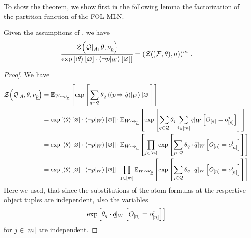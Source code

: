 To show the theorem, we show first in the following lemma the factorization of the partition function of the FOL MLN.

\begin{lemma}\label{lem:FOLpartitionfunctionfactorization}
	Given the assumptions of , we have
	\begin{align*}
		\frac{\mathcal{Z}{\left(\mathcal{Q} |_{A},\theta , \nu_{\underline{p}}\right)}}{\mathrm{exp}\left[\left\langle \theta\right\rangle \left[ \varnothing \right] \cdot \left\langle {\lnot p}|_{W}\right\rangle \left[ \varnothing \right]\right]} = \left(\mathcal{Z}{\left((\mathcal{F},\theta),\mu\right)}\right)^m \, .
	\end{align*}
\end{lemma}
\begin{proof}
	We have
	\begin{align*}
		\mathcal{Z}{\left(\mathcal{Q} |_{A},\theta , \nu_{\underline{p}}\right)} 
		&= \mathbb{E}_{W\sim\nu_{\underline{p}}}\left[
			 \mathrm{exp}\left[\sum_{q\in\mathcal{Q}}\theta_{q}\left\langle {(p\Rightarrow\tilde{q})}|_{W}\right\rangle \left[ \varnothing \right]\right] 
		\right] \\
		&= \mathrm{exp}\left[\left\langle \theta\right\rangle \left[ \varnothing \right] \cdot \left\langle {\lnot p}|_{W}\right\rangle \left[ \varnothing \right]\right] \cdot 
		\mathbb{E}_{W\sim\nu_{\underline{p}}}\left[
			 \mathrm{exp}\left[\sum_{q\in\mathcal{Q}}\theta_{q}  \sum_{j\in[m]} {\tilde{q}}|_{W} \left[O_{[n]} = o_{[n]}^{j}\right] \right] 
		\right] \\
		&= \mathrm{exp}\left[\left\langle \theta\right\rangle \left[ \varnothing \right] \cdot \left\langle {\lnot p}|_{W}\right\rangle \left[ \varnothing \right]\right] \cdot 
		\mathbb{E}_{W\sim\nu_{\underline{p}}}\left[
			\prod_{j\in[m]} \mathrm{exp}\left[ \sum_{q\in\mathcal{Q}} \theta_{q} \cdot {\tilde{q}}|_{W} \left[O_{[n]} = o_{[n]}^{j}\right] \right] 
		\right] \\
		&= \mathrm{exp}\left[\left\langle \theta\right\rangle \left[ \varnothing \right] \cdot \left\langle {\lnot p}|_{W}\right\rangle \left[ \varnothing \right]\right] \cdot 
			\prod_{j\in[m]} 
			 \mathbb{E}_{W\sim\nu_{\underline{p}}}\left[
			 \mathrm{exp}\left[ \sum_{q\in\mathcal{Q}} \theta_{q} \cdot {\tilde{q}}|_{W} \left[O_{[n]} = o_{[n]}^{j}\right] \right] 
		\right] \\
	\end{align*}
	Here we used, that since the substitutions of the atom formulas at the respective object tuples are independent, also the variables
		\[ \mathrm{exp}\left[\theta_{q}  \cdot {\tilde{q}}|_{W} \left[O_{[n]} = o_{[n]}^{j}\right]  \right] \]
	for $j\in[m]$ are independent.
	

\end{proof}
